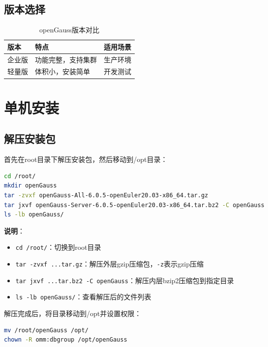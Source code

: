 \documentclass[12pt,UTF8]{ctexbook}
\begin{document}
\subsection{版本选择}

\begin{table}[htbp]
    \centering
    \caption{openGauss版本对比}
    \label{tab:version_compare}
    \begin{tabular}{|l|l|l|}
    \hline
    \textbf{版本} & \textbf{特点} & \textbf{适用场景} \\ \hline
    企业版 & 功能完整，支持集群 & 生产环境 \\ \hline
    轻量版 & 体积小，安装简单 & 开发测试 \\ \hline
    \end{tabular}
\end{table}

\section{单机安装}

\subsection{解压安装包}

首先在root目录下解压安装包，然后移动到/opt目录：

\begin{lstlisting}[language=bash, caption=解压安装包]
cd /root/
mkdir openGauss
tar -zvxf openGauss-All-6.0.5-openEuler20.03-x86_64.tar.gz
tar jxvf openGauss-Server-6.0.5-openEuler20.03-x86_64.tar.bz2 -C openGauss
ls -lb openGauss/
\end{lstlisting}

\textbf{说明}：
\begin{itemize}[leftmargin=2cm]
    \item \texttt{cd /root/}：切换到root目录
    \item \texttt{tar -zvxf ...tar.gz}：解压外层gzip压缩包，\texttt{-z}表示gzip压缩
    \item \texttt{tar jxvf ...tar.bz2 -C openGauss}：解压内层bzip2压缩包到指定目录
    \item \texttt{ls -lb openGauss/}：查看解压后的文件列表
\end{itemize}

解压完成后，将目录移动到/opt并设置权限：

\begin{lstlisting}[language=bash, caption=移动目录并设置权限]
mv /root/openGauss /opt/
chown -R omm:dbgroup /opt/openGauss
\end{lstlisting}
\end{document}
